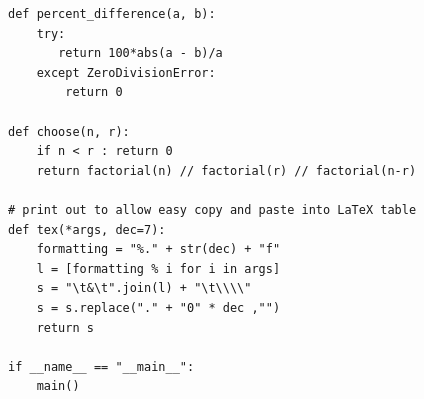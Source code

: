 \documentclass[11pt]{extarticle}
\begin{document}
\begin{verbatim}
def percent_difference(a, b):
    try:
       return 100*abs(a - b)/a
    except ZeroDivisionError:
        return 0

def choose(n, r):
    if n < r : return 0
    return factorial(n) // factorial(r) // factorial(n-r)

# print out to allow easy copy and paste into LaTeX table
def tex(*args, dec=7):
    formatting = "%." + str(dec) + "f"
    l = [formatting % i for i in args]
    s = "\t&\t".join(l) + "\t\\\\"
    s = s.replace("." + "0" * dec ,"")
    return s

if __name__ == "__main__":
    main()

\end{verbatim}
\normalsize

\tiny
\begin{verbatim}
\end{verbatim}
\normalsize




\clearpage
\doublespacing


\end{document}
